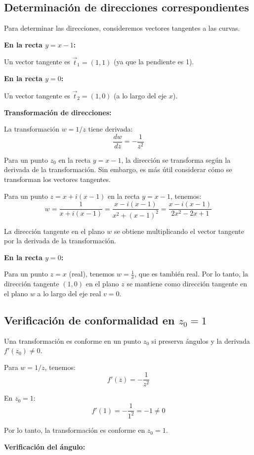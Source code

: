 \documentclass{article}
\begin{document}
\subsection*{Determinación de direcciones correspondientes}

Para determinar las direcciones, consideremos vectores tangentes a las curvas.

\textbf{En la recta $y = x - 1$:}

Un vector tangente es $\vec{t}_1 = (1, 1)$ (ya que la pendiente es 1).

\textbf{En la recta $y = 0$:}

Un vector tangente es $\vec{t}_2 = (1, 0)$ (a lo largo del eje $x$).

\textbf{Transformación de direcciones:}

La transformación $w = 1/z$ tiene derivada:
$$\frac{dw}{dz} = -\frac{1}{z^2}$$

Para un punto $z_0$ en la recta $y = x - 1$, la dirección se transforma según la derivada de la transformación. Sin embargo, es más útil considerar cómo se transforman los vectores tangentes.

Para un punto $z = x + i(x - 1)$ en la recta $y = x - 1$, tenemos:
$$w = \frac{1}{x + i(x - 1)} = \frac{x - i(x - 1)}{x^2 + (x - 1)^2} = \frac{x - i(x - 1)}{2x^2 - 2x + 1}$$

La dirección tangente en el plano $w$ se obtiene multiplicando el vector tangente por la derivada de la transformación.

\textbf{En la recta $y = 0$:}

Para un punto $z = x$ (real), tenemos $w = \frac{1}{x}$, que es también real. Por lo tanto, la dirección tangente $(1, 0)$ en el plano $z$ se mantiene como dirección tangente en el plano $w$ a lo largo del eje real $v = 0$.

\subsection*{Verificación de conformalidad en $z_0 = 1$}

Una transformación es conforme en un punto $z_0$ si preserva ángulos y la derivada $f'(z_0) \neq 0$.

Para $w = 1/z$, tenemos:
$$f'(z) = -\frac{1}{z^2}$$

En $z_0 = 1$:
$$f'(1) = -\frac{1}{1^2} = -1 \neq 0$$

Por lo tanto, la transformación es conforme en $z_0 = 1$.

\textbf{Verificación del ángulo:}
\end{document}
